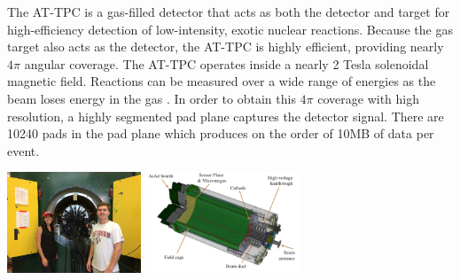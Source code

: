 \documentclass[ansiepaper,portrait]{baposter}
\begin{document}
\begin{poster}
{{%
}
}
{\small{The AT-TPC is a gas-filled detector that acts as both the detector and target for high-efficiency detection of low-intensity, exotic nuclear reactions. Because the gas target also acts as the detector, the AT-TPC is highly efficient, providing nearly ${4\pi}$ angular coverage. The AT-TPC operates inside a nearly 2 Tesla solenoidal magnetic field. Reactions can be measured over a wide range of energies as the beam loses energy in the gas \cite{ATTPC-NIM}.
In order to obtain this ${4\pi}$ coverage with high resolution, a highly segmented pad plane captures the detector signal. There are 10240 pads in the pad plane which produces on the order of 10MB of data per event.}

\begin{center}
\includegraphics [height=30mm]{michigan_trip.jpg} 
\hspace{0.2cm}
\includegraphics [height=30mm] {attpc.png}
\end{center}


}
\end{poster}
\end{document}
